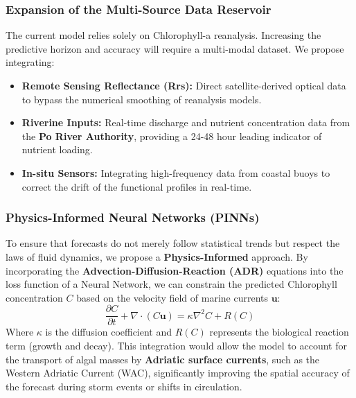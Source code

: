 \subsubsection{Expansion of the Multi-Source Data Reservoir}
The current model relies solely on Chlorophyll-a reanalysis. Increasing the predictive horizon and accuracy will require a multi-modal dataset. We propose integrating:
\begin{itemize}
    \item \textbf{Remote Sensing Reflectance (Rrs):} Direct satellite-derived optical data to bypass the numerical smoothing of reanalysis models.
    \item \textbf{Riverine Inputs:} Real-time discharge and nutrient concentration data from the \textbf{Po River Authority}, providing a 24-48 hour leading indicator of nutrient loading.
    \item \textbf{In-situ Sensors:} Integrating high-frequency data from coastal buoys to correct the drift of the functional profiles in real-time.
\end{itemize}

\subsubsection{Physics-Informed Neural Networks (PINNs)}
To ensure that forecasts do not merely follow statistical trends but respect the laws of fluid dynamics, we propose a \textbf{Physics-Informed} approach. By incorporating the \textbf{Advection-Diffusion-Reaction (ADR)} equations into the loss function of a Neural Network, we can constrain the predicted Chlorophyll concentration $C$ based on the velocity field of marine currents $\mathbf{u}$:
\begin{equation}
    \frac{\partial C}{\partial t} + \nabla \cdot (C\mathbf{u}) = \kappa \nabla^2 C + R(C)
\end{equation}
Where $\kappa$ is the diffusion coefficient and $R(C)$ represents the biological reaction term (growth and decay). This integration would allow the model to account for the transport of algal masses by \textbf{Adriatic surface currents}, such as the Western Adriatic Current (WAC), significantly improving the spatial accuracy of the forecast during storm events or shifts in circulation.

\newpage




